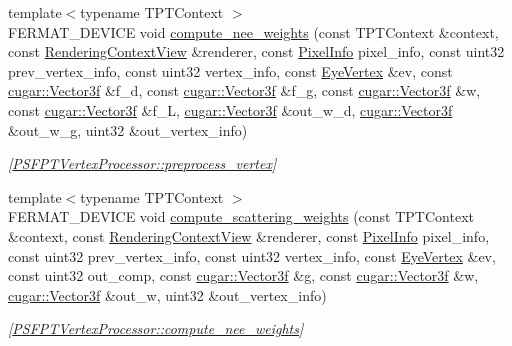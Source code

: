 \begin{DoxyCompactItemize}
{\footnotesize template$<$typename T\+P\+T\+Context $>$ }\\F\+E\+R\+M\+A\+T\+\_\+\+D\+E\+V\+I\+CE void \hyperlink{struct_p_s_f_p_t_vertex_processor_ad0208c56ea8196913977b3029c14be61}{compute\+\_\+nee\+\_\+weights} (const T\+P\+T\+Context \&context, const \hyperlink{struct_rendering_context_view}{Rendering\+Context\+View} \&renderer, const \hyperlink{union_pixel_info}{Pixel\+Info} pixel\+\_\+info, const uint32 prev\+\_\+vertex\+\_\+info, const uint32 vertex\+\_\+info, const \hyperlink{struct_eye_vertex}{Eye\+Vertex} \&ev, const \hyperlink{structcugar_1_1_vector}{cugar\+::\+Vector3f} \&f\+\_\+d, const \hyperlink{structcugar_1_1_vector}{cugar\+::\+Vector3f} \&f\+\_\+g, const \hyperlink{structcugar_1_1_vector}{cugar\+::\+Vector3f} \&w, const \hyperlink{structcugar_1_1_vector}{cugar\+::\+Vector3f} \&f\+\_\+L, \hyperlink{structcugar_1_1_vector}{cugar\+::\+Vector3f} \&out\+\_\+w\+\_\+d, \hyperlink{structcugar_1_1_vector}{cugar\+::\+Vector3f} \&out\+\_\+w\+\_\+g, uint32 \&out\+\_\+vertex\+\_\+info)
\begin{DoxyCompactList}\small\item\em \mbox{[}\hyperlink{struct_p_s_f_p_t_vertex_processor_ae26801cfa7d5de8979979419f5edc934}{P\+S\+F\+P\+T\+Vertex\+Processor\+::preprocess\+\_\+vertex}\mbox{]} \end{DoxyCompactList}\item 
{\footnotesize template$<$typename T\+P\+T\+Context $>$ }\\F\+E\+R\+M\+A\+T\+\_\+\+D\+E\+V\+I\+CE void \hyperlink{struct_p_s_f_p_t_vertex_processor_afa5301047bd57d917658b4b8eb2bd075}{compute\+\_\+scattering\+\_\+weights} (const T\+P\+T\+Context \&context, const \hyperlink{struct_rendering_context_view}{Rendering\+Context\+View} \&renderer, const \hyperlink{union_pixel_info}{Pixel\+Info} pixel\+\_\+info, const uint32 prev\+\_\+vertex\+\_\+info, const uint32 vertex\+\_\+info, const \hyperlink{struct_eye_vertex}{Eye\+Vertex} \&ev, const uint32 out\+\_\+comp, const \hyperlink{structcugar_1_1_vector}{cugar\+::\+Vector3f} \&g, const \hyperlink{structcugar_1_1_vector}{cugar\+::\+Vector3f} \&w, \hyperlink{structcugar_1_1_vector}{cugar\+::\+Vector3f} \&out\+\_\+w, uint32 \&out\+\_\+vertex\+\_\+info)
\begin{DoxyCompactList}\small\item\em \mbox{[}\hyperlink{struct_p_s_f_p_t_vertex_processor_ad0208c56ea8196913977b3029c14be61}{P\+S\+F\+P\+T\+Vertex\+Processor\+::compute\+\_\+nee\+\_\+weights}\mbox{]} \end{DoxyCompactList}\item 

\end{DoxyCompactItemize}
